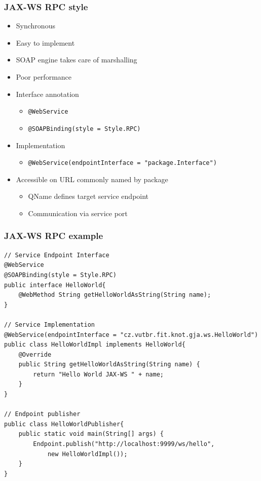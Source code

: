 \documentclass[10pt,xcolor=pdflatex]{beamer}
\begin{document}
\begin{frame}[containsverbatim]\frametitle{JAX-WS RPC style}
\begin{itemize}
	\item Synchronous
	\item Easy to implement
	\item SOAP engine takes care of marshalling
	\item Poor performance
	\item Interface annotation
      \begin{itemize}
    	\item \texttt{@WebService}
		\item \texttt{@SOAPBinding(style = Style.RPC)}
      \end{itemize}
    \item Implementation
      \begin{itemize}
    	\item {\footnotesize \texttt{@WebService(endpointInterface = "package.Interface")}}
      \end{itemize}
    \item Accessible on URL commonly named by package
      \begin{itemize}
    	\item QName defines target service endpoint 
		\item Communication via service port
      \end{itemize}
\end{itemize}
\end{frame}


\begin{frame}[containsverbatim]\frametitle{JAX-WS RPC example}
\begin{footnotesize}
\begin{verbatim}
// Service Endpoint Interface
@WebService
@SOAPBinding(style = Style.RPC)
public interface HelloWorld{
    @WebMethod String getHelloWorldAsString(String name);
}

// Service Implementation
@WebService(endpointInterface = "cz.vutbr.fit.knot.gja.ws.HelloWorld")
public class HelloWorldImpl implements HelloWorld{
    @Override
    public String getHelloWorldAsString(String name) {
        return "Hello World JAX-WS " + name;
    }
}

// Endpoint publisher
public class HelloWorldPublisher{
    public static void main(String[] args) {
        Endpoint.publish("http://localhost:9999/ws/hello", 
            new HelloWorldImpl());
    }
}
\end{verbatim}
\end{footnotesize}
\end{frame}
\end{document}
